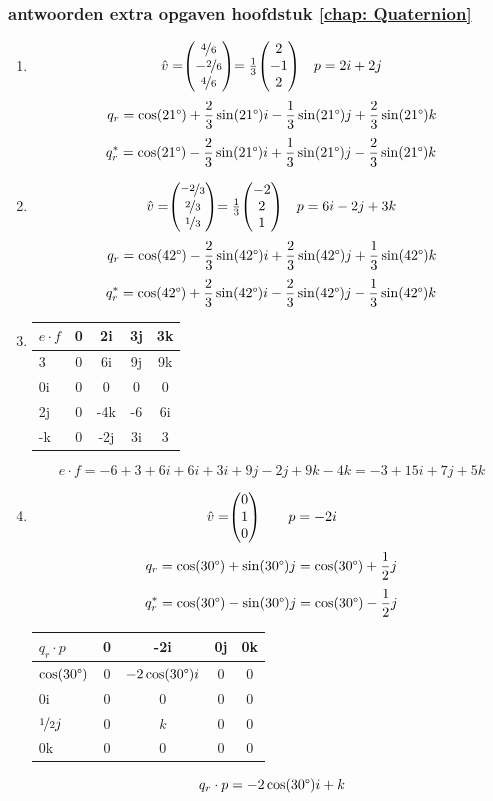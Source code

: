 \subsubsection{antwoorden extra opgaven hoofdstuk \ref{chap: Quaternion}}
\begin{enumerate}
	\item 
	\[\hat{v} = \vecdrie{\nicefrac{4}{6}}{-\nicefrac{2}{6}}{\nicefrac{4}{6}} = \frac{1}{3}\vecdrie{2}{-1}{2}
	\quad p  = 2i + 2j\]
	\[q_r   =  \cos(21 \degree)  + \frac{2}{3}\sin(21 \degree) i - \frac{1}{3}\sin(21 \degree) j + \frac{2}{3} \sin(21 \degree) k\]
	\[q^*_r =  \cos(21 \degree)  - \frac{2}{3}\sin(21 \degree) i + \frac{1}{3}\sin(21 \degree) j - \frac{2}{3} \sin(21 \degree) k\]
	
	\item 
	\[\hat{v} = \vecdrie{\nicefrac{-2}{3}}{\nicefrac{2}{3}}{\nicefrac{1}{3}} = \frac{1}{3}\vecdrie{-2}{2}{1}
	\quad p  = 6i - 2j + 3k\]
    \[ q_r  =  \cos(42 \degree)  - \frac{2}{3}\sin(42 \degree) i + \frac{2}{3}\sin(42 \degree) j + \frac{1}{3}\sin(42 \degree) k \]
	\[q^*_r      =  \cos(42 \degree)  + \frac{2}{3}\sin(42 \degree) i	- \frac{2}{3}\sin(42 \degree) j - \frac{1}{3}\sin(42 \degree) k\]
		
	\item
	\begin{NiceTabular}{ | a | c | c | c | c |}
		\hline
         \RowStyle{\color{white}} %
	 $ e\cdot f $ & 0 & 2i  & 3j & 3k \\           & 0 & 6i  & 9j & 9k \\ \hline
		0i         & 0 & 0   & 0  & 0  \\ \hline
		2j         & 0 & -4k & -6 & 6i \\ \hline
		-k         & 0 & -2j & 3i & 3  \\ 
		\hline 
	\end{NiceTabular}
	\[e\cdot f = -6+3+6i+6i+3i+9j-2j+9k-4k = -3 +15i + 7j + 5k \]
	
	\item 
	\[\hat{v} = \vecdrie{0}{1}{0} \qquad p  = -2i \]
	\[q_r    =  \cos(30 \degree)  + \sin(30 \degree) j  =  \cos(30 \degree) + \frac{1}{2}j\]
	\[q^*_r  =  \cos(30 \degree)  - \sin(30 \degree) j  =  \cos(30 \degree) - \frac{1}{2}j \]
	\begin{NiceTabular}{ | a | c | c | c | c |}
		\hline
         \RowStyle{\color{white}} %
		$ q_r\cdot p $        & 0 & -2i  &   0j   & 0k \\ \hline
		$\cos(30 \degree) $   & 0 & $ -2\cos(30 \degree) i  $ &   0    & 0  \\ \hline
		0i                    & 0 & 0    &   0    & 0  \\ \hline
		$\nicefrac{1}{2}j$    & 0 & $k$  &   0    & 0  \\ \hline
		0k                    & 0 & 0    &   0    & 0  \\ 
		\hline 
	\end{NiceTabular}
	\[q_r\cdot p = -2\cos(30 \degree) i + k\]
	

\end{enumerate}
